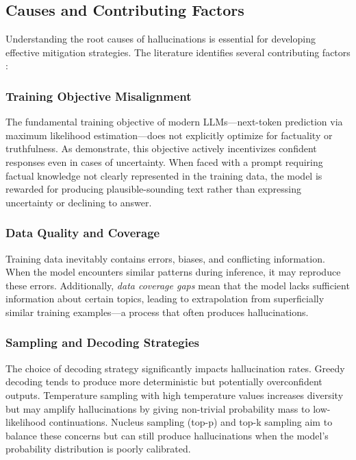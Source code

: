 \subsection{Causes and Contributing Factors}

Understanding the root causes of hallucinations is essential for developing effective mitigation strategies. The literature identifies several contributing factors \citep{huang2023survey,openai2025bluffing}:

\subsubsection{Training Objective Misalignment}

The fundamental training objective of modern LLMs—next-token prediction via maximum likelihood estimation—does not explicitly optimize for factuality or truthfulness. As \citet{openai2025bluffing} demonstrate, this objective actively incentivizes confident responses even in cases of uncertainty. When faced with a prompt requiring factual knowledge not clearly represented in the training data, the model is rewarded for producing plausible-sounding text rather than expressing uncertainty or declining to answer.

\subsubsection{Data Quality and Coverage}

Training data inevitably contains errors, biases, and conflicting information. When the model encounters similar patterns during inference, it may reproduce these errors. Additionally, \textit{data coverage gaps} mean that the model lacks sufficient information about certain topics, leading to extrapolation from superficially similar training examples—a process that often produces hallucinations.

\subsubsection{Sampling and Decoding Strategies}

The choice of decoding strategy significantly impacts hallucination rates. Greedy decoding tends to produce more deterministic but potentially overconfident outputs. Temperature sampling with high temperature values increases diversity but may amplify hallucinations by giving non-trivial probability mass to low-likelihood continuations. Nucleus sampling (top-p) and top-k sampling aim to balance these concerns but can still produce hallucinations when the model's probability distribution is poorly calibrated.

